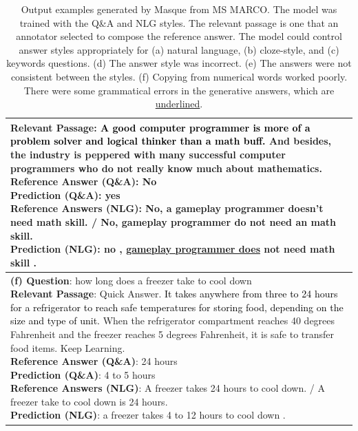 \documentclass[11pt,a4paper]{article}
\newcommand{\cmark}{\ding{51}}%
\newcommand{\xmark}{\ding{55}}%
\theoremstyle{mydef}
\theoremstyle{myprob}
\begin{document}
\begin{table}[h!]
{\begin{tabular}{p{50em}}
{\textbf{Relevant Passage}: \textcolor{black}{A good computer programmer is more of a problem solver and logical thinker than a math buff.} And besides, the industry is peppered with many successful computer programmers who do not really know much about mathematics. \\
\textbf{Reference Answer (Q\&A)}: No \\
\textbf{Prediction (Q\&A)}: yes \xmark \\
\textbf{Reference Answers (NLG)}: No, a gameplay programmer doesn't need math skill. / No, gameplay programmer do not need an math skill.\\
\textbf{Prediction (NLG)}: no , \underline{gameplay programmer does} not need math skill . \cmark
}
\vspace{1pt}
\\ \hline
\vspace{0.5pt}
\pbox{50em}{
\textbf{(f) Question}: how long does a freezer take to cool down\\
\textbf{Relevant Passage}: Quick Answer. \textcolor{black}{It takes anywhere from three to 24 hours for a refrigerator to reach safe temperatures for storing food, depending on the size and type of unit.} When the refrigerator compartment reaches 40 degrees Fahrenheit and the freezer reaches 5 degrees Fahrenheit, it is safe to transfer food items. Keep Learning. \\
\textbf{Reference Answer (Q\&A)}: 24 hours\\
\textbf{Prediction (Q\&A)}: 4 to 5 hours \xmark \\
\textbf{Reference Answers (NLG)}: A freezer takes 24 hours to cool down. / A  freezer take to cool down is 24 hours.\\
\textbf{Prediction (NLG)}: a freezer takes 4 to 12 hours to cool down . \xmark
}
\vspace{1pt}
\\ \hline
\end{tabular}
}
\caption{Output examples generated by Masque from MS MARCO.  The model was trained with the Q\&A and NLG styles. The relevant passage is one that an annotator selected to compose the reference answer. The model could control answer styles appropriately for (a) natural language, (b) cloze-style, and (c) keywords questions. (d) The answer style %
was incorrect. (e)
The answers were not consistent between the styles. (f) Copying from numerical words worked poorly. There were some grammatical errors in the generative answers, which are \underline{underlined}. 
}
\label{tb:examples}
\end{table}
\end{document}
